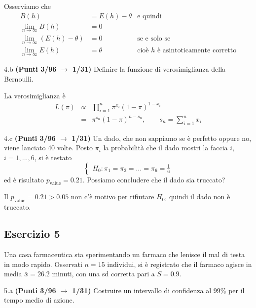 \documentclass[
  11pt,
]{book}
\theoremstyle{mytheoremstyle}
\theoremstyle{mydefstyle}
\newenvironment{sol}
  {
  \begin{tcolorbox}[enhanced,breakable,arc=0.1mm,boxrule=1pt,colback=white,colframe=iblue,
  title=\bf \fontfamily{lmss}\selectfont \hspace{.5 cm} Soluzione,drop fuzzy shadow]

}{
\end{tcolorbox}
  }
\begin{document}
\begin{sol}
Osserviamo che
\begin{align*}
B(h) &= E(h)-\theta&\text{e quindi}\\
\lim_{n\to\infty}B(h)&=0\\
\lim_{n\to\infty}(E(h)-\theta)&=0 &\text{se e solo se}\\
\lim_{n\to\infty}E(h)&=\theta &\text{cioè $h$ è asintoticamente corretto}
\end{align*}

\end{sol}

4.b \textbf{(Punti 3/96 \(\rightarrow\) 1/31)} Definire la funzione di verosimiglianza della Bernoulli.

\begin{sol}
La verosimiglianza è
\begin{eqnarray*}
L(\pi)     &\propto& \prod_{i=1}^n \pi^{x_i}(1-\pi)^{1-x_i}\\
           &=& \pi^{s_n}(1-\pi)^{n-s_n}, \qquad s_n=\sum_{i=1}^n x_i
\end{eqnarray*}

\end{sol}

4.c \textbf{(Punti 3/96 \(\rightarrow\) 1/31)} Un dado, che non sappiamo se è perfetto oppure no, viene lanciato 40 volte.
Posto \(\pi_i\) la probabilità che il dado mostri la faccia \(i\), \(i=1,...,6\), si è testato
\[
\begin{cases}
H_0:\pi_1=\pi_2=...=\pi_6=\frac 16
\end{cases}
\]
ed è risultato \(p_\text{value}=0.21\). Possiamo concludere che il dado sia truccato?

\begin{sol}
Il \(p_\text{value}=0.21>0.05\) non c'è motivo per rifiutare \(H_0\), quindi il dado non è truccato.

\end{sol}

\subsection{Esercizio 5}\label{esercizio-5-5}

Una casa farmaceutica sta sperimentando un farmaco che lenisce il mal di testa in modo rapido. Osservati \(n=15\) individui, si è registrato che il farmaco agisce in media \(\bar x=26.2\) minuti, con una sd corretta pari a
\(S=0.9\).

5.a \textbf{(Punti 3/96 \(\rightarrow\) 1/31)} Costruire un intervallo di confidenza al 99\% per il tempo medio di azione.
\end{document}
